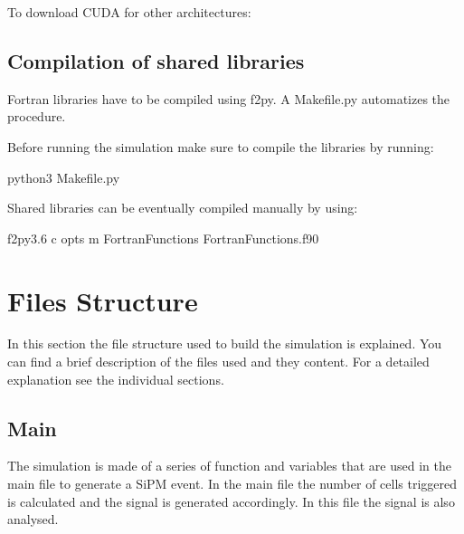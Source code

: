 \documentclass[letterpaper,10pt,english]{sphinxmanual}
\begin{document}
To download CUDA for other architectures: 


\section{Compilation of shared libraries}
\label{\detokenize{installation:compilation-of-shared-libraries}}
\begin{DUlineblock}{0em}
\item[] Fortran libraries have to be compiled using f2py. A Makefile.py automatizes the procedure.
\item[] Before running the simulation make sure to compile the libraries by running:
\end{DUlineblock}

\begin{sphinxVerbatim}[commandchars=\\\{\}]
python3 Makefile.py
\end{sphinxVerbatim}

Shared libraries can be eventually compiled manually by using:

\begin{sphinxVerbatim}[commandchars=\\\{\}]
f2py3.6 \PYGZhy{}c \PYGZhy{}\PYGZhy{}opts   \PYGZhy{}m FortranFunctions FortranFunctions.f90
\end{sphinxVerbatim}


\chapter{Files Structure}
\label{\detokenize{structure:files-structure}}\label{\detokenize{structure::doc}}
In this section the file structure used to build the simulation is explained. You can find a brief description of the files used and they content. For a detailed explanation see the individual sections.


\section{Main}
\label{\detokenize{structure:main}}
The simulation is made of a series of function and variables that are used in the main file to generate a SiPM event. In the main file the number of cells triggered is calculated and the signal is generated accordingly. In this file the signal is also analysed.
\end{document}
